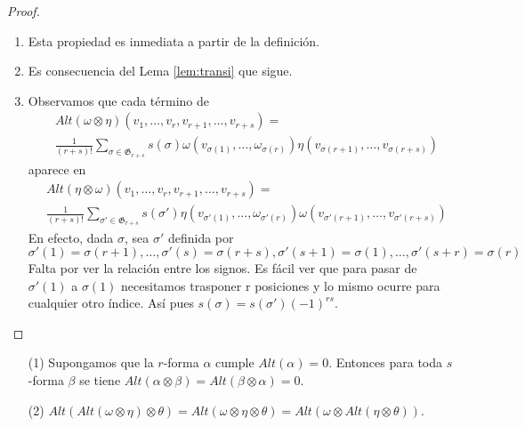 \documentclass[\main/VD_completo.tex]{subfiles}
\begin{document}
\begin{proof}
\begin{enumerate}
\item Esta propiedad es inmediata a partir de la definición.
\item Es consecuencia del Lema \ref{lem:transi} que sigue.
\item Observamos que cada término de
\begin{align*}
&Alt(\omega\otimes\eta)(v_1,\ldots,v_r,v_{r+1},\ldots,v_{r+s})=\\
&\frac{1}{(r+s)!}\sum_{\sigma\in \mathfrak{G}_{r+s}}s(\sigma)\omega(v_{\sigma(1)},\ldots,\omega_{\sigma(r)})\eta(v_{\sigma(r+1)},\ldots,v_{\sigma(r+s)})
\end{align*}
aparece en
\begin{align*}
&Alt(\eta\otimes\omega)(v_1,\ldots,v_r,v_{r+1},\ldots,v_{r+s})=\\
&\frac{1}{(r+s)!}\sum_{\sigma'\in \mathfrak{G}_{r+s}}s(\sigma')\eta(v_{\sigma'(1)},\ldots,\omega_{\sigma'(r)})\omega(v_{\sigma'(r+1)},\ldots,v_{\sigma'(r+s)})
\end{align*}
En efecto, dada \( \sigma \), sea \( \sigma' \) definida por
\(
\sigma'(1)=\sigma(r+1),\ldots,\sigma'(s)=\sigma(r+s),\sigma'(s+1)=\sigma(1),\ldots,\sigma'(s+r)=\sigma(r)
\)
Falta por ver la relación entre los signos. Es fácil ver que para pasar de \( \sigma'(1) \) a \( \sigma(1) \) necesitamos trasponer r posiciones y lo mismo ocurre para cualquier otro índice. Así pues \( s(\sigma)= s(\sigma')(-1)^{rs} \).
\end{enumerate}
\end{proof}

\begin{lemma}\label{lem:transi}
	\begin{enumerate}
\item [(1)] Supongamos que la \(r\)-forma \( \alpha \) cumple \( Alt(\alpha)=0 \). Entonces para toda \(s\)-forma \( \beta \) se tiene \( Alt(\alpha\otimes\beta)=Alt(\beta\otimes\alpha)=0 \).
\item [(2)] \( Alt(Alt(\omega\otimes\eta)\otimes\theta)=Alt(\omega\otimes\eta\otimes\theta)=Alt(\omega\otimes Alt(\eta\otimes \theta)) \).
\end{enumerate}
\end{lemma}
\end{document}
